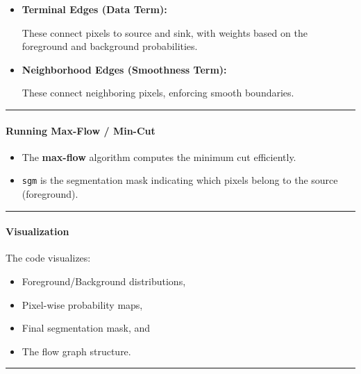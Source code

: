 \documentclass[11pt]{article}
\providecommand{\tightlist}{%
      \setlength{\itemsep}{0pt}\setlength{\parskip}{0pt}}
\begin{document}
\begin{itemize}
\item
  \textbf{Terminal Edges (Data Term):}

  These connect pixels to source and sink, with weights based on the
  foreground and background probabilities.
\item
  \textbf{Neighborhood Edges (Smoothness Term):}

  These connect neighboring pixels, enforcing smooth boundaries.
\end{itemize}

\begin{center}\rule{0.5\linewidth}{0.5pt}\end{center}

\hypertarget{running-max-flow-min-cut}{%
\paragraph{\texorpdfstring{\textbf{Running Max-Flow /
Min-Cut}}{Running Max-Flow / Min-Cut}}\label{running-max-flow-min-cut}}

\begin{itemize}
\tightlist
\item
  The \textbf{max-flow} algorithm computes the minimum cut efficiently.
\item
  \texttt{sgm} is the segmentation mask indicating which pixels belong
  to the source (foreground).
\end{itemize}

\begin{center}\rule{0.5\linewidth}{0.5pt}\end{center}

\hypertarget{visualization}{%
\paragraph{\texorpdfstring{\textbf{Visualization}}{Visualization}}\label{visualization}}

The code visualizes:

\begin{itemize}
\tightlist
\item
  Foreground/Background distributions,
\item
  Pixel-wise probability maps,
\item
  Final segmentation mask, and
\item
  The flow graph structure.
\end{itemize}

\begin{center}\rule{0.5\linewidth}{0.5pt}\end{center}
\end{document}
